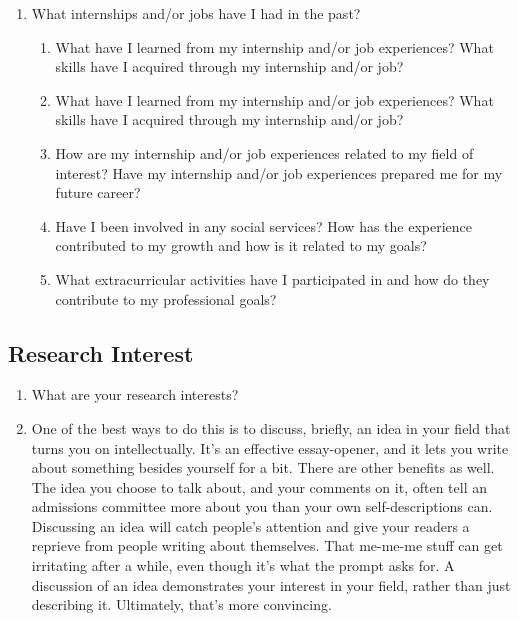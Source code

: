 \documentclass[a4paper,12pt]{article}%
\begin{document}
\begin{enumerate}
	  \hrulefill
	  
\item What internships and/or jobs have I had in the past?
	 \begin{enumerate}
	\item What have I learned from my internship and/or job experiences? What skills have I acquired through my internship and/or job?
	\item 	What have I learned from my internship and/or job experiences? What skills have I acquired through my internship and/or job?
	\item How are my internship and/or job experiences related to my field of interest? Have my internship and/or job experiences prepared me for my future career?
	\item Have I been involved in any social services? How has the experience contributed to my growth and how is it related to my goals?
	\item What extracurricular activities have I participated in and how do they contribute to my professional goals?
	
		  \hrulefill
		  
	  \hrulefill
	  
\end{enumerate}
\end{enumerate}
	  \hrulefill
	  
	  \hrulefill
	  
	  \hrulefill
	  
\subsection{Research Interest}
\label{sec:ResearchInterest}

  \begin{enumerate}
	\item What are your research interests? 
	\item  One of the best ways to do this is to discuss, briefly, an idea in your field that turns you on intellectually. It's an effective essay-opener, and it lets you write about something besides yourself for a bit. There are other benefits as well. The idea you choose to talk about, and your comments on it, often tell an admissions committee more about you than your own self-descriptions can.
Discussing an idea will catch people's attention and give your readers a reprieve from people writing about themselves. That me-me-me  stuff can get irritating after a while, even though it's what the prompt asks for. A discussion of an idea demonstrates your interest in your field, rather than just describing it. Ultimately, that's more convincing.
	\end{enumerate}
		  \hrulefill
		  
\end{document}
